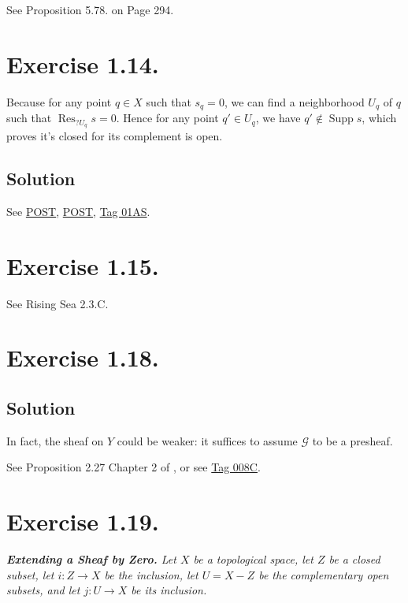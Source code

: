 See \cite{rotman2009introduction} Proposition 5.78. on Page 294.

\section{Exercise 1.14.}\label{Hart Chap 2 Ex 1.14.}

Because for any point $q\in X$ such that $s_q=0$, we can find a neighborhood $U_q$ of $q$ such that $\operatorname{Res}_{?U_q}s=0$. Hence for any point $q'\in U_q$, we have $q'\notin \operatorname{Supp} s$, which proves it's closed for its complement is open.

\subsection{Solution}

See \href{https://math.stackexchange.com/questions/2080018/prove-that-the-support-of-a-section-of-a-sheaf-is-a-closed-set}{POST}, \href{https://math.stackexchange.com/questions/2418007/the-support-of-a-sheaf-is-not-necessarily-closed#:~:text=Then%20we%20have%20Su,not%20closed%20in%20Zariski%20topology.}{POST}, \href{https://stacks.math.columbia.edu/tag/01AS}{Tag 01AS}.

\section{Exercise 1.15.}

See Rising Sea 2.3.C.

\section{Exercise 1.18.}

\subsection{Solution}

In fact, the sheaf on $Y$ could be weaker: it suffices to assume $\mathcal G$ to be a presheaf.

See Proposition 2.27 Chapter 2 of \cite{gortz2020algebraic}, or see \href{https://stacks.math.columbia.edu/tag/008C}{Tag 008C}.


\section{Exercise 1.19.}\label{Hart Chap 2 Ex 1.19.}

\textit{\textbf{Extending a Sheaf by Zero.} Let $X$ be a topological space, let $Z$ be a closed subset, let $i:Z\to X$ be the inclusion, let $U=X-Z$ be the complementary open subsets, and let $j:U\to X$ be its inclusion.}

